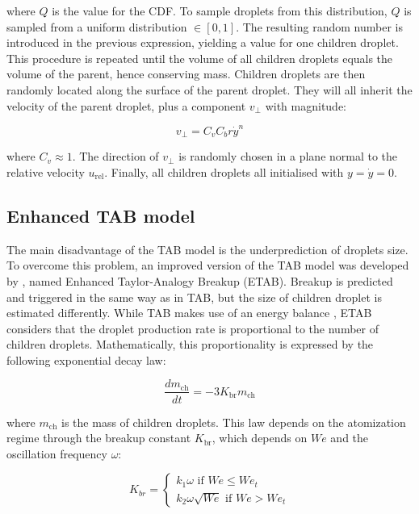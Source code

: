 where $Q$ is the value for the CDF. To sample droplets from this distribution, $Q$ is sampled from a uniform distribution $\in [0,1]$. The resulting random number is introduced in the previous expression, yielding a value for one children droplet. This procedure is repeated until the volume of all children droplets equals the volume of the parent, hence conserving mass. Children droplets are then randomly located along the surface of the parent droplet. They will all inherit the velocity of the parent droplet, plus a component $v_\perp$ with magnitude:

\begin{equation}
\label{eq:TAB_v_perp}
v_\perp = C_v C_b r \dot{y}^n
\end{equation}

where $C_v \approx 1$. The direction of $v_\perp$ is randomly chosen in a plane normal to the relative velocity $u_\mathrm{rel}$. Finally, all children droplets all initialised with $y = \dot{y} = 0$.



\subsection{Enhanced TAB model}

The main disadvantage of the TAB model is the underprediction of droplets size. To overcome this problem, an improved version of the TAB model was developed by , named Enhanced Taylor-Analogy Breakup (ETAB). Breakup is predicted and triggered in the same way as in TAB, but the size of children droplet is estimated differently. While TAB makes use of an energy balance , ETAB considers that the droplet production rate is proportional to the number of children droplets. Mathematically, this proportionality is expressed by the following exponential decay law:

\begin{equation}
\label{eq:ETAB_rate_production_law}
\frac{d m_\mathrm{ch}}{dt} = - 3 K_\mathrm{br} m_\mathrm{ch}
\end{equation}

where $m_\mathrm{ch}$ is the mass of children droplets. This law depends on the atomization regime through the breakup constant $K_\mathrm{br}$, which depends on $We$ and the oscillation frequency $\omega$:

\begin{equation}
\label{eq:ETAB_Kbr_equation}
K_{br} =
\left\{
    \begin{split}
    k_1 \omega \,\,\mathrm{if}\,\,We \leq We_t \\ 
    k_2 \omega \sqrt{We} \,\,\mathrm{if}\,\,We > We_t
    \end{split}
\right.
\end{equation}

